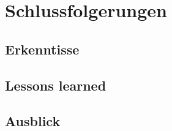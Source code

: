 \chapter{Schlussfolgerungen}

\section{Erkenntisse}



\section{Lessons learned}



\section{Ausblick}